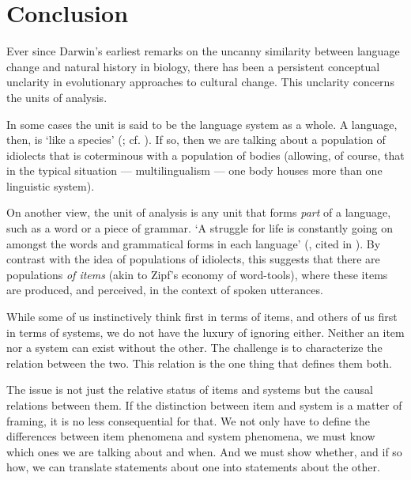 \chapter{Conclusion}



Ever since Darwin's earliest remarks on the uncanny similarity between 
language change and natural history in biology, there has been a 
persistent conceptual unclarity in evolutionary approaches to cultural 
change. This unclarity concerns the units of analysis. 



In some cases the unit is said to be the language system as a whole. A 
language, then, is \textquoteleft like a species' (\citealt[60]{darwin_descent_1871}; cf. \citealt[192-194]{mufwene_ecology_2001}). If so, then we are talking about a population 
of idiolects that is coterminous with a population of bodies (allowing, 
of course, that in the typical situation --- multilingualism --- one body houses 
more than one linguistic system). 



On another view, the unit of analysis is any unit that forms \textit{part} of a language, such as a word or a piece of grammar. \textquoteleft A struggle 
for life is constantly going on amongst the words and grammatical forms 
in each language' (\citealt{muller_darwinism_1870}, cited in \citealt[60]{darwin_descent_1871}). By
contrast with the idea of populations of idiolects, this suggests that 
there are populations \textit{of items }(akin to Zipf's economy of 
word-tools), where these items are produced, and perceived, in the 
context of spoken utterances. 



While some of us instinctively think first in terms of items, and others 
of us first in terms of systems, we do not have the luxury of ignoring either. 
Neither an item nor a system can exist without the other. The challenge 
is to characterize the relation between the two. This relation is the 
one thing that defines them both. 



The issue is not just the relative status of items and systems but the 
causal relations between them. If the distinction 
between item and system is a matter of framing, it is no less 
consequential for that. We not only have to define the differences 
between item phenomena and system phenomena, we must know which ones we 
are talking about and when. And we must show whether, and if so how, we 
can translate statements about one into statements about the other. 

